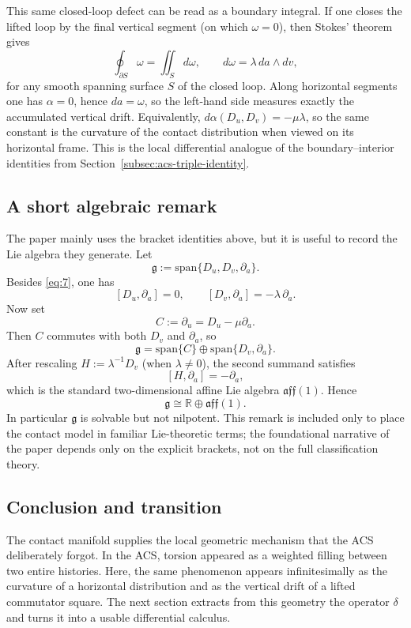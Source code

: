 This same closed-loop defect can be read as a boundary integral. If one closes the lifted loop by the final vertical segment (on which $\omega=0$), then Stokes' theorem gives
\begin{equation}\label{eq:8}\tag{8}
\oint_{\partial S}\omega=\iint_S d\omega,
\qquad
d\omega=\lambda\,da\wedge dv,
\end{equation}
for any smooth spanning surface $S$ of the closed loop. Along horizontal segments one has $\alpha=0$, hence $da=\omega$, so the left-hand side measures exactly the accumulated vertical drift. Equivalently, $d\alpha(D_u,D_v)=-\mu\lambda$, so the same constant is the curvature of the contact distribution when viewed on its horizontal frame. This is the local differential analogue of the boundary--interior identities from Section~\ref{subsec:acs-triple-identity}.

\subsection{A short algebraic remark}
\label{subsec:contact-algebra-remark}

The paper mainly uses the bracket identities above, but it is useful to record the Lie algebra they generate. Let
\[
    \mathfrak g:=\mathrm{span}\{D_u,D_v,\partial_a\}.
\]
Besides \eqref{eq:7}, one has
\[
    [D_u,\partial_a]=0,
    \qquad
    [D_v,\partial_a]=-\lambda\,\partial_a.
\]
Now set
\[
    C:=\partial_u=D_u-\mu\partial_a.
\]
Then $C$ commutes with both $D_v$ and $\partial_a$, so
\[
    \mathfrak g
    =\mathrm{span}\{C\}\oplus\mathrm{span}\{D_v,\partial_a\}.
\]
After rescaling $H:=\lambda^{-1}D_v$ (when $\lambda\neq 0$), the second summand satisfies
\[
    [H,\partial_a]=-\partial_a,
\]
which is the standard two-dimensional affine Lie algebra $\mathfrak{aff}(1)$. Hence
\[
    \mathfrak g\cong \mathbb{R}\oplus\mathfrak{aff}(1).
\]
In particular $\mathfrak g$ is solvable but not nilpotent. This remark is included only to place the contact model in familiar Lie-theoretic terms; the foundational narrative of the paper depends only on the explicit brackets, not on the full classification theory.

\subsection{Conclusion and transition}

The contact manifold supplies the local geometric mechanism that the ACS deliberately forgot. In the ACS, torsion appeared as a weighted filling between two entire histories. Here, the same phenomenon appears infinitesimally as the curvature of a horizontal distribution and as the vertical drift of a lifted commutator square. The next section extracts from this geometry the operator $\delta$ and turns it into a usable differential calculus.
